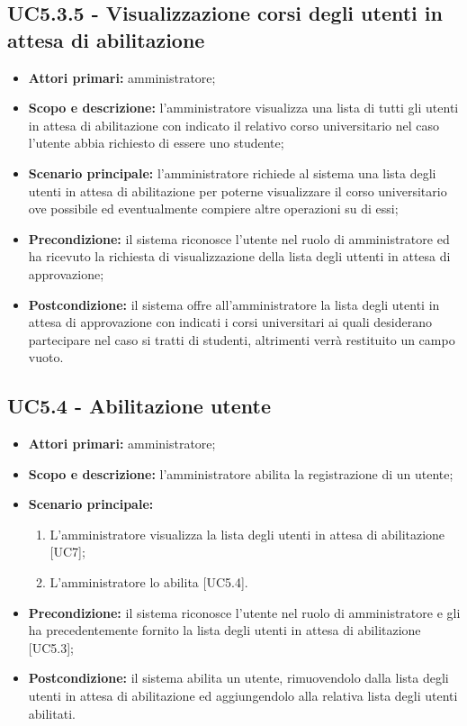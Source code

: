 \documentclass[AnalisiDeiRequisiti.tex]{subfiles}
\begin{document}
\subsection{UC5.3.5 - Visualizzazione corsi degli utenti in attesa di abilitazione}
\begin{itemize}
	\item \textbf{Attori primari:} amministratore;
	\item \textbf{Scopo e descrizione:} l'amministratore visualizza una lista di tutti gli utenti in attesa di abilitazione con indicato il relativo corso universitario nel caso l'utente abbia richiesto di essere uno studente;
	\item \textbf{Scenario principale:} l'amministratore richiede al sistema una lista degli utenti in attesa di abilitazione per poterne visualizzare il corso universitario ove possibile ed eventualmente compiere altre operazioni su di essi;
	\item \textbf{Precondizione:} il sistema riconosce l'utente nel ruolo di amministratore ed ha ricevuto la richiesta di visualizzazione della lista degli uttenti in attesa di approvazione;
	\item \textbf{Postcondizione:} il sistema offre all'amministratore la lista degli utenti in attesa di approvazione con indicati i corsi universitari ai quali desiderano partecipare nel caso si tratti di studenti, altrimenti verrà restituito un campo vuoto.
\end{itemize}
\subsection{UC5.4 - Abilitazione utente}
\begin{itemize}
	\item \textbf{Attori primari:} amministratore;
	\item \textbf{Scopo e descrizione:} l'amministratore abilita la registrazione di un utente;
	\item \textbf{Scenario principale:}
	\begin{enumerate}
		\item L'amministratore visualizza la lista degli utenti in attesa di abilitazione [UC7];
		\item L'amministratore lo abilita [UC5.4].
	\end{enumerate}
	\item \textbf{Precondizione:} il sistema riconosce l'utente nel ruolo di amministratore e gli ha precedentemente fornito la lista degli utenti in attesa di abilitazione [UC5.3];
	\item \textbf{Postcondizione:} il sistema abilita un utente, rimuovendolo dalla lista degli utenti in attesa di abilitazione ed aggiungendolo alla relativa lista degli utenti abilitati.
\end{itemize}
\end{document}
